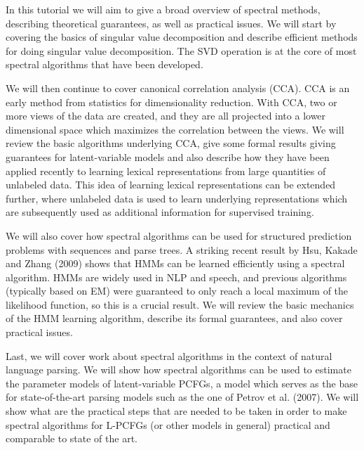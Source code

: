 In this tutorial we will aim to give a broad overview of spectral methods, describing theoretical guarantees, as well as practical issues. We will start by covering the basics of singular value decomposition and describe efficient methods for doing singular value decomposition. The SVD operation is at the core of most spectral algorithms that have been developed.

We will then continue to cover canonical correlation analysis (CCA). CCA is an early method from statistics for dimensionality reduction. With CCA, two or more views of the data are created, and they are all projected into a lower dimensional space which maximizes the correlation between the views. We will review the basic algorithms underlying CCA, give some formal results giving guarantees for latent-variable models and also describe how they have been applied recently to learning lexical representations from large quantities of unlabeled data. This idea of learning lexical representations can be extended further, where unlabeled data is used to learn underlying representations which are subsequently used as additional information for supervised training.

We will also cover how spectral algorithms can be used for structured prediction problems with sequences and parse trees. A striking recent result by Hsu, Kakade and Zhang (2009) shows that HMMs can be learned efficiently using a spectral algorithm. HMMs are widely used in NLP and speech, and previous algorithms (typically based on EM) were guaranteed to only reach a local maximum of the likelihood function, so this is a crucial result. We will review the basic mechanics of the HMM learning algorithm, describe its formal guarantees, and also cover practical issues.

Last, we will cover work about spectral algorithms in the context of natural language parsing. We will show how spectral algorithms can be used to estimate the parameter models of latent-variable PCFGs, a model which serves as the base for state-of-the-art parsing models such as the one of Petrov et al. (2007). We will show what are the practical steps that are needed to be taken in order to make spectral algorithms for L-PCFGs (or other models in general) practical and comparable to state of the art.
